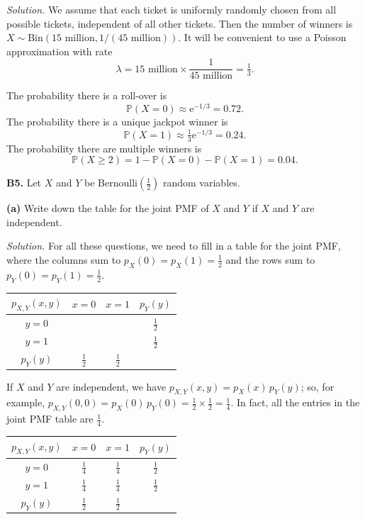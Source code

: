 \documentclass[
  a4paper,
]{book}
\theoremstyle{definition}
\theoremstyle{definition}
\theoremstyle{definition}
\theoremstyle{definition}
\theoremstyle{remark}
\begin{document}
\begin{myanswers}
\emph{Solution.}
We assume that each ticket is uniformly randomly chosen from all possible tickets, independent of all other tickets. Then the number of winners is \(X \sim \text{Bin}(15 \text{ million}, 1/(45 \text{ million}))\).
It will be convenient to use a Poisson approximation with rate
\[ \lambda = 15 \text{ million} \times \frac{1}{45 \text{ million}} = \tfrac13 .  \]

The probability there is a roll-over is
\[ \mathbb P(X = 0) \approx \mathrm e^{-1/3} = 0.72 . \]
The probability there is a unique jackpot winner is
\[ \mathbb P(X = 1) \approx \tfrac13 \mathrm e^{-1/3} = 0.24 . \]
The probability there are multiple winners is
\[ \mathbb P(X \geq 2) = 1 - \mathbb P(X = 0) - \mathbb P(X = 1) = 0.04  . \]

\end{myanswers}

\textbf{B5.} Let \(X\) and \(Y\) be Bernoulli\((\frac12)\) random variables.

\textbf{(a)} Write down the table for the joint PMF of \(X\) and \(Y\) if \(X\) and \(Y\) are independent.

\begin{myanswers}

\emph{Solution.}
For all these questions, we need to fill in a table for the joint PMF, where the columns sum to \(p_X(0) = p_X(1) = \frac12\) and the rows sum to \(p_Y(0) = p_Y(1) = \frac12\).

\begin{longtable}[]{@{}cccc@{}}
\toprule()
\(p_{X,Y}(x,y)\) & \(x = 0\) & \(x = 1\) & \(p_Y(y)\) \\
\midrule()
\endhead
\(y = 0\) & & & \(\frac12\) \\
\(y = 1\) & & & \(\frac12\) \\
\(p_Y(y)\) & \(\frac12\) & \(\frac12\) & \\
\bottomrule()
\end{longtable}

If \(X\) and \(Y\) are independent, we have \(p_{X,Y}(x,y) = p_X(x)\,p_Y(y)\); so, for example, \(p_{X,Y}(0,0) = p_X(0)\,p_Y(0) = \frac12 \times \frac12 = \frac14\). In fact, all the entries in the joint PMF table are \(\frac14\).

\begin{longtable}[]{@{}cccc@{}}
\toprule()
\(p_{X,Y}(x,y)\) & \(x = 0\) & \(x = 1\) & \(p_Y(y)\) \\
\midrule()
\endhead
\(y = 0\) & \(\frac14\) & \(\frac14\) & \(\frac12\) \\
\(y = 1\) & \(\frac14\) & \(\frac14\) & \(\frac12\) \\
\(p_Y(y)\) & \(\frac12\) & \(\frac12\) & \\
\bottomrule()
\end{longtable}

\end{myanswers}
\end{document}
